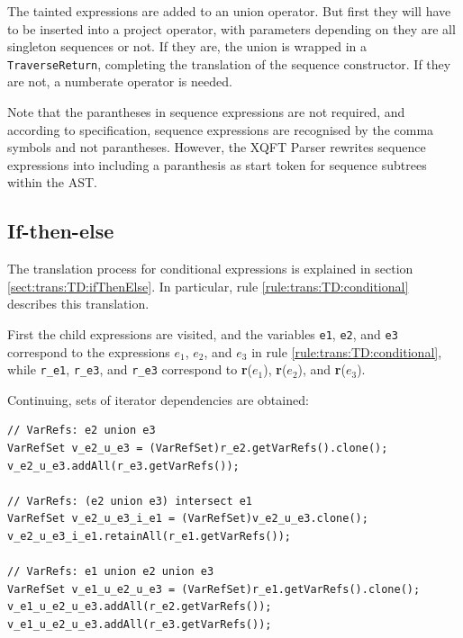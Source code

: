 The tainted expressions are added to an \textsf{union} operator. But first they will have to be inserted into a
\textsf{project} operator, with parameters depending on they are all singleton sequences or not. If they are, the
union is wrapped in a \texttt{TraverseReturn}, completing the translation of the sequence constructor. If they are
not, a \textsf{numberate} operator is needed.

Note that the parantheses in sequence expressions are not required, and
according to specification, sequence expressions are recognised by the comma
symbols and not parantheses. However, the XQFT Parser rewrites sequence
expressions into including a paranthesis as start token for sequence subtrees
within the AST.

\subsection{If-then-else}
The translation process for conditional expressions is explained in section
\ref{sect:trans:TD:ifThenElse}. In particular, rule
\ref{rule:trans:TD:conditional} describes this translation. 
%         

First the child expressions are visited, and the variables \texttt{e1},
\texttt{e2}, and \texttt{e3} correspond to the expressions $e_1$, $e_2$, and
$e_3$ in rule \ref{rule:trans:TD:conditional},  while \texttt{r\_e1},
\texttt{r\_e3}, and \texttt{r\_e3} correspond to \textbf{r}($e_1$),
\textbf{r}($e_2$), and \textbf{r}($e_3$).

Continuing, sets of iterator dependencies are obtained:
         
\begin{Verbatim}
// VarRefs: e2 union e3
VarRefSet v_e2_u_e3 = (VarRefSet)r_e2.getVarRefs().clone();
v_e2_u_e3.addAll(r_e3.getVarRefs());

// VarRefs: (e2 union e3) intersect e1
VarRefSet v_e2_u_e3_i_e1 = (VarRefSet)v_e2_u_e3.clone();
v_e2_u_e3_i_e1.retainAll(r_e1.getVarRefs());

// VarRefs: e1 union e2 union e3
VarRefSet v_e1_u_e2_u_e3 = (VarRefSet)r_e1.getVarRefs().clone();
v_e1_u_e2_u_e3.addAll(r_e2.getVarRefs());
v_e1_u_e2_u_e3.addAll(r_e3.getVarRefs());
\end{Verbatim}

